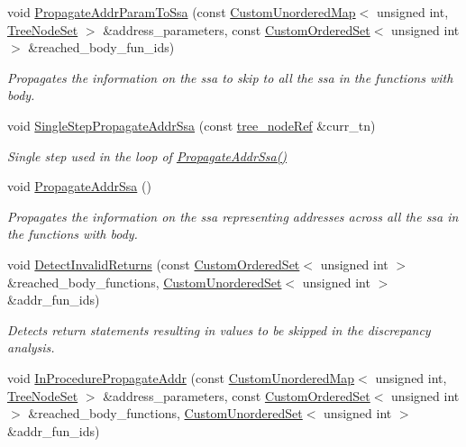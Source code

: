 \begin{DoxyCompactItemize}
void \hyperlink{classVcdSignalSelection_af1921e71908a17971a4da3ed06f3850b}{Propagate\+Addr\+Param\+To\+Ssa} (const \hyperlink{custom__map_8hpp_ad1ed68f2ff093683ab1a33522b144adc}{Custom\+Unordered\+Map}$<$ unsigned int, \hyperlink{classTreeNodeSet}{Tree\+Node\+Set} $>$ \&address\+\_\+parameters, const \hyperlink{classCustomOrderedSet}{Custom\+Ordered\+Set}$<$ unsigned int $>$ \&reached\+\_\+body\+\_\+fun\+\_\+ids)
\begin{DoxyCompactList}\small\item\em Propagates the information on the ssa to skip to all the ssa in the functions with body. \end{DoxyCompactList}\item 
void \hyperlink{classVcdSignalSelection_ae525accf24ad365699762d821c108804}{Single\+Step\+Propagate\+Addr\+Ssa} (const \hyperlink{tree__node_8hpp_a6ee377554d1c4871ad66a337eaa67fd5}{tree\+\_\+node\+Ref} \&curr\+\_\+tn)
\begin{DoxyCompactList}\small\item\em Single step used in the loop of \hyperlink{classVcdSignalSelection_a2c6b3c717e45415bbd12fa5f82401b58}{Propagate\+Addr\+Ssa()} \end{DoxyCompactList}\item 
void \hyperlink{classVcdSignalSelection_a2c6b3c717e45415bbd12fa5f82401b58}{Propagate\+Addr\+Ssa} ()
\begin{DoxyCompactList}\small\item\em Propagates the information on the ssa representing addresses across all the ssa in the functions with body. \end{DoxyCompactList}\item 
void \hyperlink{classVcdSignalSelection_a632534f4dfe6c520a1736d508c25c1a1}{Detect\+Invalid\+Returns} (const \hyperlink{classCustomOrderedSet}{Custom\+Ordered\+Set}$<$ unsigned int $>$ \&reached\+\_\+body\+\_\+functions, \hyperlink{classCustomUnorderedSet}{Custom\+Unordered\+Set}$<$ unsigned int $>$ \&addr\+\_\+fun\+\_\+ids)
\begin{DoxyCompactList}\small\item\em Detects return statements resulting in values to be skipped in the discrepancy analysis. \end{DoxyCompactList}\item 
void \hyperlink{classVcdSignalSelection_aa804b30439f86e4f9f2de7a57dd206d7}{In\+Procedure\+Propagate\+Addr} (const \hyperlink{custom__map_8hpp_ad1ed68f2ff093683ab1a33522b144adc}{Custom\+Unordered\+Map}$<$ unsigned int, \hyperlink{classTreeNodeSet}{Tree\+Node\+Set} $>$ \&address\+\_\+parameters, const \hyperlink{classCustomOrderedSet}{Custom\+Ordered\+Set}$<$ unsigned int $>$ \&reached\+\_\+body\+\_\+functions, \hyperlink{classCustomUnorderedSet}{Custom\+Unordered\+Set}$<$ unsigned int $>$ \&addr\+\_\+fun\+\_\+ids)

\end{DoxyCompactItemize}
